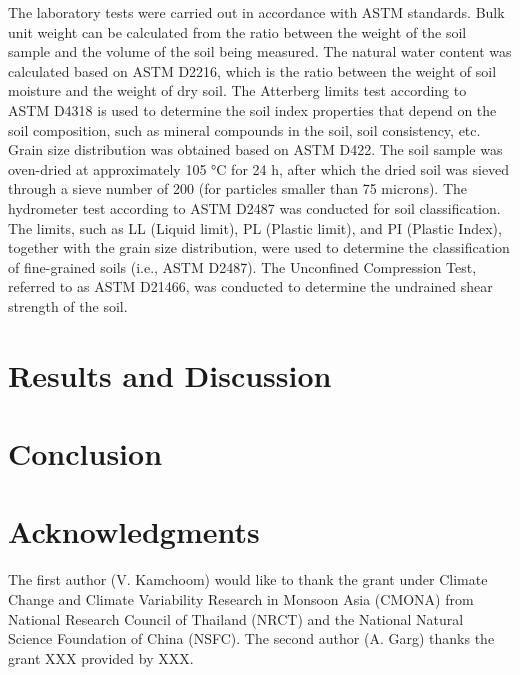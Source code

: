 \documentclass[12pt,a4paper]{article}
\begin{document}
	The laboratory tests were carried out in accordance with ASTM standards. Bulk unit weight can be calculated from the ratio between the weight of the soil sample and the volume of the soil being measured. The natural water content was calculated based on ASTM D2216, which is the ratio between the weight of soil moisture and the weight of dry soil. The Atterberg limits test according to ASTM D4318 is used to determine the soil index properties that depend on the soil composition, such as mineral compounds in the soil, soil consistency, etc. Grain size distribution was obtained based on ASTM D422. The soil sample was oven-dried at approximately 105 °C for 24 h, after which the dried soil was sieved through a sieve number of 200 (for particles smaller than 75 microns). The hydrometer test according to ASTM D2487 was conducted for soil classification. The limits, such as LL (Liquid limit), PL (Plastic limit), and PI (Plastic Index), together with the grain size distribution, were used to determine the classification of fine-grained soils (i.e., ASTM D2487). The Unconfined Compression Test, referred to as ASTM D21466, was conducted to determine the undrained shear strength of the soil.
	
	\section{Results and Discussion}
	
	
	
	\section{Conclusion}
	
	\section*{Acknowledgments}
	
	The first author (V. Kamchoom) would like to thank the grant under Climate Change and Climate Variability Research in Monsoon Asia (CMONA) from National Research Council of Thailand (NRCT) and the National Natural Science Foundation of China (NSFC). The second author (A. Garg) thanks the grant XXX provided by XXX. 
	
	
	
	
\end{document}
